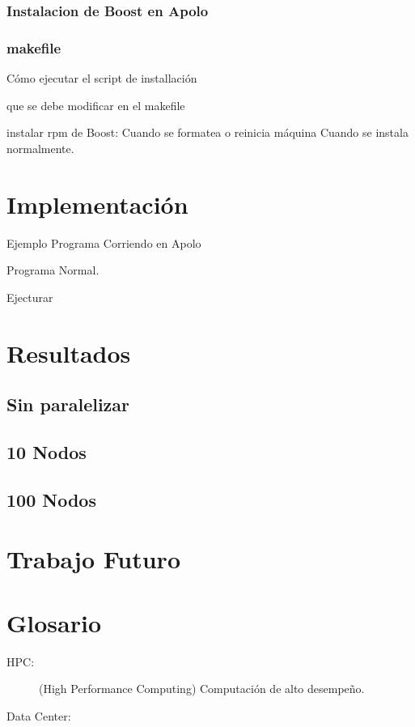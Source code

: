 \documentclass[twoside,letterpaper,12pt]{report}
\begin{document}
\subsection{Instalacion de Boost en Apolo}

\subsection{makefile}

Cómo ejecutar el script de installación 

que se debe modificar en el makefile\cite{Wall2000}

instalar rpm de Boost:
Cuando se formatea o reinicia máquina
Cuando se instala normalmente.


\chapter{Implementación}

Ejemplo Programa Corriendo en Apolo

Programa Normal. 

Ejecturar


\chapter{Resultados}

\section{Sin paralelizar}
\section{10 Nodos}
\section{100 Nodos}

\chapter{Trabajo Futuro}

\chapter{Glosario}
\label{chapGlosario}

\begin{description}
	\item[HPC:] (High Performance Computing) Computación de alto desempeño.
	\item[Data Center:]
\end{description}
\end{document}
